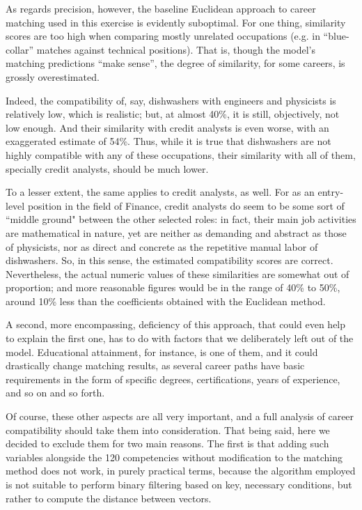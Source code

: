 \documentclass{article}
\begin{document}
As regards precision, however, the baseline Euclidean approach to career
matching used in this exercise is evidently suboptimal. For one thing,
similarity scores are too high when comparing mostly unrelated occupations
(e.g. in ``blue-collar'' matches against technical positions). That is, though
the model's matching predictions ``make sense'', the degree of similarity, for
some careers, is grossly overestimated.

Indeed, the compatibility of, say, dishwashers with engineers and physicists is
relatively low, which is realistic; but, at almost 40\%, it is still,
objectively, not low enough. And their similarity with credit analysts is even
worse, with an exaggerated estimate of 54\%. Thus, while it is true that
dishwashers are not highly compatible with any of these occupations, their
similarity with all of them, specially credit analysts, should be much lower.

To a lesser extent, the same applies to credit analysts, as well. For as an
entry-level position in the field of Finance, credit analysts do seem to be
some sort of ``middle ground" between the other selected roles: in fact, their
main job activities are mathematical in nature, yet are neither as demanding
and abstract as those of physicists, nor as direct and concrete as the
repetitive manual labor of dishwashers. So, in this sense, the estimated
compatibility scores are correct. Nevertheless, the actual numeric values of
these similarities are somewhat out of proportion; and more reasonable figures
would be in the range of 40\% to 50\%, around 10\% less than the coefficients
obtained with the Euclidean method.

A second, more encompassing, deficiency of this approach, that could even help
to explain the first one, has to do with factors that we deliberately left out
of the model. Educational attainment, for instance, is one of them, and it
could drastically change matching results, as several career paths have basic
requirements in the form of specific degrees, certifications, years of
experience, and so on and so forth.

Of course, these other aspects are all very important, and a full analysis of
career compatibility should take them into consideration. That being said, here
we decided to exclude them for two main reasons. The first is that adding such
variables alongside the 120 competencies without modification to the matching
method does not work, in purely practical terms, because the algorithm employed
is not suitable to perform binary filtering based on key, necessary conditions,
but rather to compute the distance between vectors.
\end{document}
